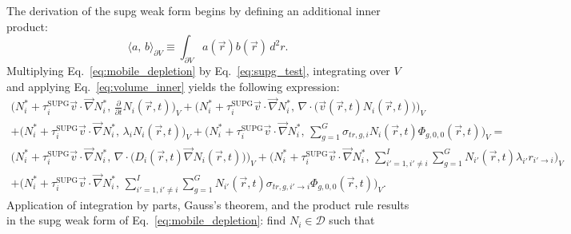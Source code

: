 The derivation of the \acrshort{supg} weak form begins by defining an additional inner product:
\begin{equation}\label{eq:full_surface_inner}
    \Bigg\langle a,\,b\Bigg\rangle_{\partial V} \equiv \int_{\partial V} a(\vec{r}) b(\vec{r})\,d^{2}r\text{.}
\end{equation}
Multiplying Eq.~\ref{eq:mobile_depletion} by Eq.~\ref{eq:supg_test}, integrating over $V$ and applying Eq.~\ref{eq:volume_inner} yields the following expression:
\begin{multline}\label{eq:mobile_depletion_wf_intermediate}
    \Bigg(N^{*}_{i} + \tau^{\text{SUPG}}_{i}\vec{v}\cdot\vec{\nabla}N^{*}_{i},\,\frac{\partial}{\partial t}N_{i}(\vec{r},t)\Bigg)_{V}
    + \Bigg(N^{*}_{i} + \tau^{\text{SUPG}}_{i}\vec{v}\cdot\vec{\nabla}N^{*}_{i},\,\nabla\cdot\Big(\vec{v}(\vec{r},t)N_{i}(\vec{r},t)\Big)\Bigg)_{V}
    \\+ \Bigg(N^{*}_{i} + \tau^{\text{SUPG}}_{i}\vec{v}\cdot\vec{\nabla}N^{*}_{i},\,\lambda_{i}N_{i}(\vec{r},t)\Bigg)_{V}
    + \Bigg(N^{*}_{i} + \tau^{\text{SUPG}}_{i}\vec{v}\cdot\vec{\nabla}N^{*}_{i},\,\sum_{g = 1}^{G}\sigma_{tr,g,i}N_{i}(\vec{r},t)\Phi_{g, 0, 0}(\vec{r},t)\Bigg)_{V}
    =
    \\\Bigg(N^{*}_{i} + \tau^{\text{SUPG}}_{i}\vec{v}\cdot\vec{\nabla}N^{*}_{i},\,\nabla\cdot\Big(D_{i}(\vec{r},t)\vec{\nabla}N_{i}(\vec{r},t)\Big)\Bigg)_{V}
    + \Bigg(N^{*}_{i} + \tau^{\text{SUPG}}_{i}\vec{v}\cdot\vec{\nabla}N^{*}_{i},\,\sum_{i' = 1,i' \neq i}^{I}\sum_{g = 1}^{G}N_{i'}(\vec{r},t)\lambda_{i'}r_{i'\rightarrow i}\Bigg)_{V}
    \\+ \Bigg(N^{*}_{i} + \tau^{\text{SUPG}}_{i}\vec{v}\cdot\vec{\nabla}N^{*}_{i},\,\sum_{i' = 1,i' \neq i}^{I}\sum_{g = 1}^{G}N_{i'}(\vec{r},t)\sigma_{tr,g,i'\rightarrow i}\Phi_{g, 0, 0}(\vec{r},t)\Bigg)_{V}\text{.}
\end{multline}
Application of integration by parts, Gauss's theorem, and the product rule results in the \acrshort{supg} weak form of Eq.~\ref{eq:mobile_depletion}: find $N_{i}\in\mathcal{D}$ such that 
